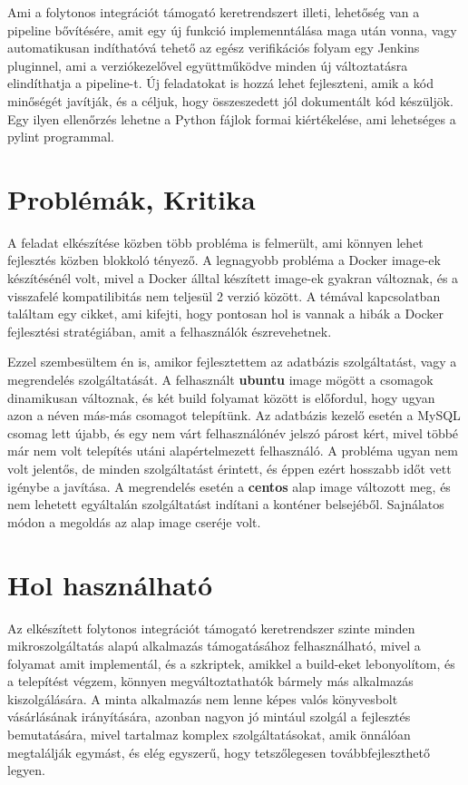 \documentclass[11pt,magyar,a4paper,twoside,]{report}
\begin{document}
Ami a folytonos integrációt támogató keretrendszert illeti, lehetőség
van a pipeline bővítésére, amit egy új funkció implemenntálása maga után
vonna, vagy automatikusan indíthatóvá tehető az egész verifikációs
folyam egy Jenkins pluginnel, ami a verziókezelővel együttműködve minden
új változtatásra elindíthatja a pipeline-t. Új feladatokat is hozzá
lehet fejleszteni, amik a kód minőségét javítják, és a céljuk, hogy
összeszedett jól dokumentált kód készüljök. Egy ilyen ellenőrzés lehetne
a Python fájlok formai kiértékelése, ami lehetséges a pylint programmal.

\section{Problémák, Kritika}\label{probluxe9muxe1k-kritika}

A feladat elkészítése közben több probléma is felmerült, ami könnyen
lehet fejlesztés közben blokkoló tényező. A legnagyobb probléma a Docker
image-ek készítésénél volt, mivel a Docker álltal készített image-ek
gyakran változnak, és a visszafelé kompatilibitás nem teljesül 2 verzió
között. A témával kapcsolatban találtam egy cikket\citep{docker-is-bad},
ami kifejti, hogy pontosan hol is vannak a hibák a Docker fejlesztési
stratégiában, amit a felhasználók észrevehetnek.

Ezzel szembesültem én is, amikor fejlesztettem az adatbázis
szolgáltatást, vagy a megrendelés szolgáltatását. A felhasznált
\textbf{ubuntu} image mögött a csomagok dinamikusan változnak, és két
build folyamat között is előfordul, hogy ugyan azon a néven más-más
csomagot telepítünk. Az adatbázis kezelő esetén a MySQL csomag lett
újabb, és egy nem várt felhasználónév jelszó párost kért, mivel többé
már nem volt telepítés utáni alapértelmezett felhasználó. A probléma
ugyan nem volt jelentős, de minden szolgáltatást érintett, és éppen
ezért hosszabb időt vett igénybe a javítása. A megrendelés esetén a
\textbf{centos} alap image változott meg, és nem lehetett egyáltalán
szolgáltatást indítani a konténer belsejéből. Sajnálatos módon a
megoldás az alap image cseréje volt.

\section{Hol használható}\label{hol-hasznuxe1lhatuxf3}

Az elkészített folytonos integrációt támogató keretrendszer szinte
minden mikroszolgáltatás alapú alkalmazás támogatásához felhasználható,
mivel a folyamat amit implementál, és a szkriptek, amikkel a build-eket
lebonyolítom, és a telepítést végzem, könnyen megváltoztathatók bármely
más alkalmazás kiszolgálására. A minta alkalmazás nem lenne képes valós
könyvesbolt vásárlásának irányítására, azonban nagyon jó mintául szolgál
a fejlesztés bemutatására, mivel tartalmaz komplex szolgáltatásokat,
amik önnálóan megtalálják egymást, és elég egyszerű, hogy tetszőlegesen
továbbfejleszthető legyen.
\end{document}

